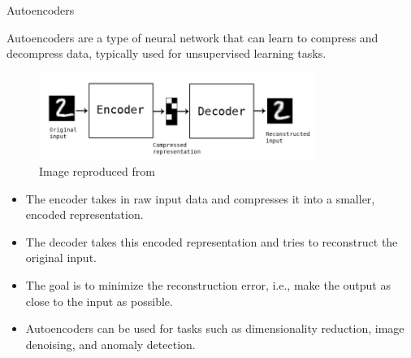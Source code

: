 %
%
%

\begin{frame}{Autoencoders}

    Autoencoders are a type of neural network that can learn to compress 
    and decompress data, typically used for unsupervised learning tasks.
    
    \begin{figure}[h]
    \centering
    \includegraphics[width=0.8\textwidth]{./images/autoencoders/autoencoder_schema.png}\\
    {\scriptsize 
    \color{col:attribution} 
    Image reproduced from \cite{KerasBlog:BuildingAutoencodersInKeras}}\\
    \end{figure}
    
    \begin{itemize}
    \item The encoder takes in raw input data and compresses it into a smaller, encoded representation.
    \item The decoder takes this encoded representation and tries to reconstruct the original input.
    \item The goal is to minimize the reconstruction error, i.e., make the output as close to the input as possible.
    \item Autoencoders can be used for tasks such as dimensionality reduction, image denoising, and anomaly detection.
    \end{itemize}
    
\end{frame}

%
%
%

